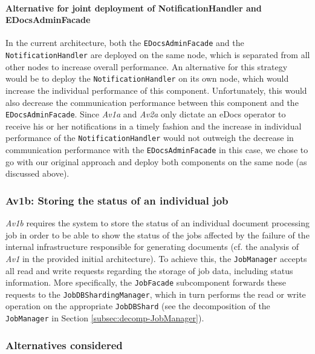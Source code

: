\documentclass[a4paper,10pt]{article}
\begin{document}
\paragraph{Alternative for joint deployment of NotificationHandler and EDocsAdminFacade}
In the current architecture, both the \texttt{EDocsAdminFacade} and the \texttt{NotificationHandler} are deployed on the same node, which is separated from all other nodes to increase overall performance. An alternative for this strategy would be to deploy the \texttt{NotificationHandler} on its own node, which would increase the individual performance of this component. Unfortunately, this would also decrease the communication performance between this component and the \texttt{EDocsAdminFacade}. Since \textit{Av1a} and \textit{Av2a} only dictate an eDocs operator to receive his or her notifications in a timely fashion and the increase in individual performance of the \texttt{NotificationHandler} would not outweigh the decrease in communication performance with the \texttt{EDocsAdminFacade} in this case, we chose to go with our original approach and deploy both components on the same node (as discussed above).

\subsubsection{Av1b: Storing the status of an individual job}\label{subsubsec:Av1b}
\textit{Av1b} requires the system to store the status of an individual document processing job in order to be able to show the status of the jobs affected by the failure of the internal infrastructure responsible for generating documents (cf. the analysis of \textit{Av1} in the provided initial architecture). To achieve this, the \texttt{JobManager} accepts all read and write requests regarding the storage of job data, including status information. More specifically, the \texttt{JobFacade} subcomponent forwards these requests to the \texttt{JobDBShardingManager}, which in turn performs the read or write operation on the appropriate \texttt{JobDBShard} (see the decomposition of the \texttt{JobManager} in Section \ref{subsec:decomp-JobManager}).
\subsubsection*{Alternatives considered}
\end{document}
